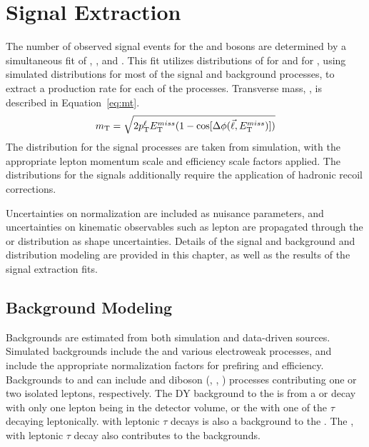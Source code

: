 \chapter{Signal Extraction}\label{ch:sig}
The number of observed signal events for the \Wpm and \Z bosons are determined by a simultaneous fit of \Wp, \Wm, and \Z. This fit utilizes distributions of \mt for \Wpm and \mll for \Z, using simulated distributions for most of the signal and background processes, to extract a production rate for each of the processes. Transverse mass, \mt, is described in Equation~\ref{eq:mt}.
\begin{equation}
m_{\mathrm{T}} = \sqrt{ 2 p_{\mathrm{T}}^{\ell} E_{\mathrm{T}}^{miss} ( 1 - \cos[\Delta\phi( {\vec \ell},E_{\mathrm{T}}^{miss} ) ] ) }
\label{eq:mt}
\end{equation}
The \mll distribution for the \zll signal processes are taken from simulation, with the appropriate lepton momentum scale and efficiency scale factors applied. The \mt distributions for the \wlnu signals additionally require the application of hadronic recoil corrections. 

Uncertainties on normalization are included as nuisance parameters, and uncertainties on kinematic observables such as lepton \pt are propagated through the \mt or \mll distribution as shape uncertainties. Details of the signal and background \mt and \mll distribution modeling are provided in this chapter, as well as the results of the signal extraction fits.

\section{Background Modeling}\label{ch:sig:bkg}
Backgrounds are estimated from both simulation and data-driven sources. Simulated backgrounds include the \ttbar and various electroweak processes, and include the appropriate normalization factors for prefiring and efficiency. Backgrounds to \W and \Z can include \ttbar and diboson (\W\W, \W\Z, \Z\Z) processes contributing one or two isolated leptons, respectively. The DY background to the \W is from a \zmm or \zee decay with only one lepton being in the detector volume, or the \ztt with one of the $\tau$ decaying leptonically. \ztt with leptonic $\tau$ decays is also a background to the \Z. The \wtaunu, with leptonic $\tau$ decay also contributes to the \W backgrounds. 

